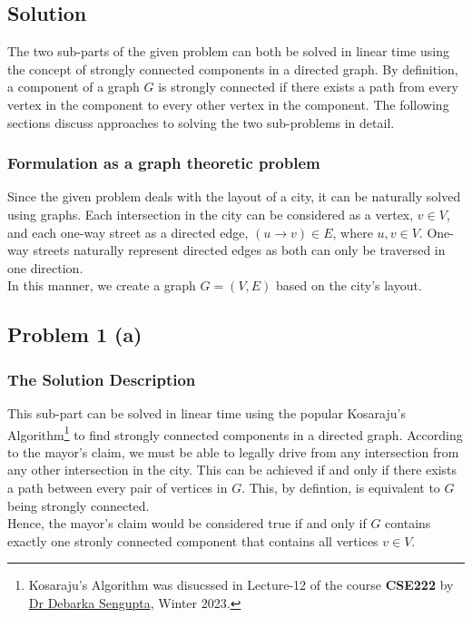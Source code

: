 \documentclass[12pt]{report}
\begin{document}
    \subsection*{Solution}
    The two sub-parts of the given problem can both be solved in linear time using the concept of strongly connected components in a directed graph.
    By definition, a component of a graph $G$ is strongly connected if there exists a path from every vertex in the component to every other vertex in the component.
    The following sections discuss approaches to solving the two sub-problems in detail.

    \subsubsection*{Formulation as a graph theoretic problem}
    Since the given problem deals with the layout of a city, it can be naturally solved using graphs.
    Each intersection in the city can be considered as a vertex, $v \in V$, and each one-way street as a directed edge, $(u \to v) \in E$, where $u, v \in V$.
    One-way streets naturally represent directed edges as both can only be traversed in one direction. \\
    In this manner, we create a graph $G = (V, E)$ based on the city's layout.

    \subsection*{Problem 1 (a)}
    \subsubsection*{The Solution Description}
    This sub-part can be solved in linear time using the popular Kosaraju's Algorithm\footnote{
        Kosaraju's Algorithm was disucssed in Lecture-12 of the course \textbf{CSE222} by \href{mailto:debarka@iiitd.ac.in}{Dr Debarka Sengupta}, Winter 2023.
    } to find strongly connected components in a directed graph.
    According to the mayor's claim, we must be able to legally drive from any intersection from any other intersection in the city.
    This can be achieved if and only if there exists a path between every pair of vertices in $G$.
    This, by defintion, is equivalent to $G$ being strongly connected. \\
    Hence, the mayor's claim would be considered true if and only if $G$ contains exactly one stronly connected component that contains all vertices $v \in V$.
\end{document}
